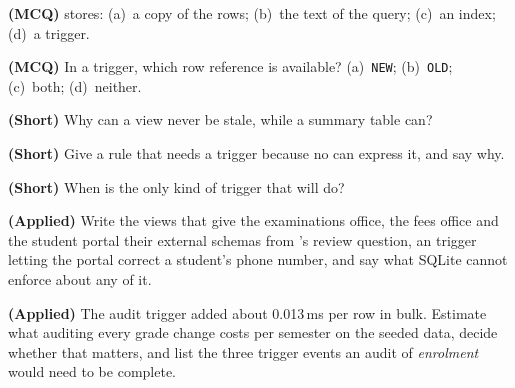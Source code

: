 \begin{reviewq}
  \item \textbf{(MCQ)}  stores: (a)~a copy of the rows;
        (b)~the text of the query; (c)~an index; (d)~a trigger.
  \item \textbf{(MCQ)} In a  trigger, which row reference is
        available? (a)~\texttt{NEW}; (b)~\texttt{OLD}; (c)~both;
        (d)~neither.
  \item \textbf{(Short)} Why can a view never be stale, while a summary table
        can?
  \item \textbf{(Short)} Give a rule that needs a trigger because no
         can express it, and say why.
  \item \textbf{(Short)} When is  the only kind of trigger
        that will do?
  \item \textbf{(Applied)} Write the views that give the examinations office,
        the fees office and the student portal their external schemas from
        's review question, an  trigger
        letting the portal correct a student's phone number, and say what
        SQLite cannot enforce about any of it.
  \item \textbf{(Applied)} The audit trigger added about 0.013\,ms per row in
        bulk.
        Estimate what auditing every grade change costs per semester on the
        seeded data, decide whether that matters, and list the three trigger
        events an audit of \textit{enrolment} would need to be complete.
\end{reviewq}

